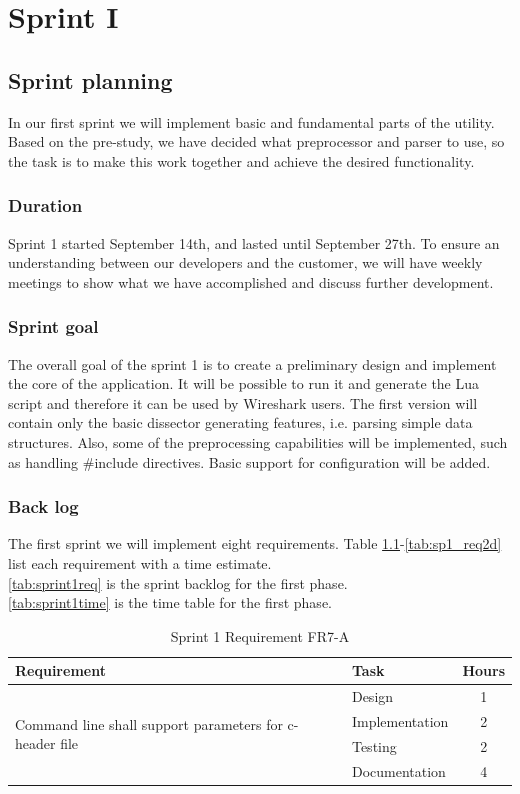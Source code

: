 \chapter{Sprint I}

\section{Sprint planning}
In our first sprint we will implement basic and fundamental parts of the utility. Based on the pre-study, we have decided what preprocessor and parser to use, so the task is to make this work together and achieve the desired functionality.  

\subsection{Duration}
Sprint 1 started September 14th, and lasted until September 27th. To ensure an understanding between our developers and the customer, we will have weekly meetings to show what we have accomplished and discuss further development. 

\subsection{Sprint goal}
The overall goal of the sprint 1 is to create a preliminary design and implement the core of the application. It will be possible to run it and generate the Lua script and therefore it can be used by Wireshark users. The first version will contain only the basic dissector generating features, i.e. parsing simple data structures. Also, some of the preprocessing capabilities will be implemented, such as handling \#include directives. Basic support for configuration will be added.

\subsection{Back log}
The first sprint we will implement eight requirements. Table \ref{tab:sp1_req7a}-\ref{tab:sp1_req2d}  list each requirement with a time estimate.\\
\autoref{tab:sprint1req} is the sprint backlog for the first phase. \\
\autoref{tab:sprint1time} is the time table for the first phase. \\
\begin{table}[!ht] \small \center
\caption{Sprint 1 Requirement FR7-A} \label{tab:sp1_req7a}
\begin{tabular}{l l c}
	\toprule
	Requirement & Task & Hours \\
	\midrule
	\multirow{4}{5cm}{Command line shall support parameters for c-header file} & Design & 1 \\
	& Implementation & 2 \\
	& Testing & 2 \\
	& Documentation & 4 \\
	\bottomrule
\end{tabular}
\end{table}

